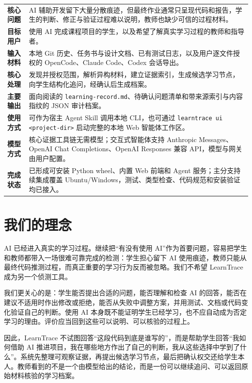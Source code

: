 \documentclass[UTF8,a4paper,12pt]{ctexart}
\begin{document}
\begin{center}
\small
\begin{tabularx}{\textwidth}{>{\bfseries\color{LearnTraceBlue}}p{}X}
\toprule
核心问题 & AI 辅助开发留下大量分散痕迹，但最终作业通常只呈现代码和报告，学生的判断、修正与验证过程难以说明，教师也缺少可信的过程材料。 \\
目标用户 & 使用 AI 完成课程项目的学生，以及希望了解真实学习过程的教师和指导者。 \\
输入材料 & 本地 Git 历史、任务书与设计文档、已有测试日志，以及用户逐文件授权的 OpenCode、Claude Code、Codex 会话导出。 \\
核心处理 & 发现并授权范围，解析异构材料，建立证据索引，生成候选学习节点，向学生结构化追问，经确认后生成档案。 \\
主要输出 & 面向阅读的 \texttt{learning-record.md}、待确认问题清单和带来源索引与内容指纹的 JSON 审计档案。 \\
使用方式 & 可作为宿主 Agent Skill 调用本地 CLI，也可通过 \texttt{learntrace ui <project-dir>} 启动完整的本地 Web 智能体工作区。 \\
模型方式 & 核心证据工具链无需模型；交互式智能体支持 Anthropic Messages、OpenAI Chat Completions、OpenAI Responses 兼容 API，模型与网关由用户配置。 \\
完成状态 & 已形成可安装 Python wheel、内置 Web 前端和 Agent 服务；主分支持续集成覆盖 Ubuntu/Windows，测试、类型检查、代码规范和安装验证均已接入。 \\
\bottomrule
\end{tabularx}
\end{center}

\section{我们的理念}

AI 已经进入真实的学习过程。继续把“有没有使用 AI”作为首要问题，容易把学生和教师都带入一场很难可靠完成的检测：学生担心留下 AI 使用痕迹，教师只能从最终代码推测过程，而真正重要的学习行为反而被忽略。我们不希望 LearnTrace 成为另一个侦测工具。

我们更关心的是：学生能否提出合适的问题，能否理解和检查 AI 的回答，能否在建议不适用时作出修改或拒绝，能否从失败中调整方案，并用测试、文档或代码变化验证自己的判断。使用 AI 本身既不能证明学生已经学习，也不应自动成为否定学习的理由。评价应当回到这些可以说明、可以核验的过程上。

因此，LearnTrace 不试图回答“这段代码到底是谁写的”，而是帮助学生回答“我如何借助 AI 推进项目，我在哪些地方作出了自己的判断，我从这些选择中学到了什么”。系统先整理可观察证据，再提出候选学习节点，最后把确认权交还给学生本人。教师看到的不是一个由模型给出的结论，而是一份可以继续追问、可以返回原始材料核验的学习档案。
\end{document}

